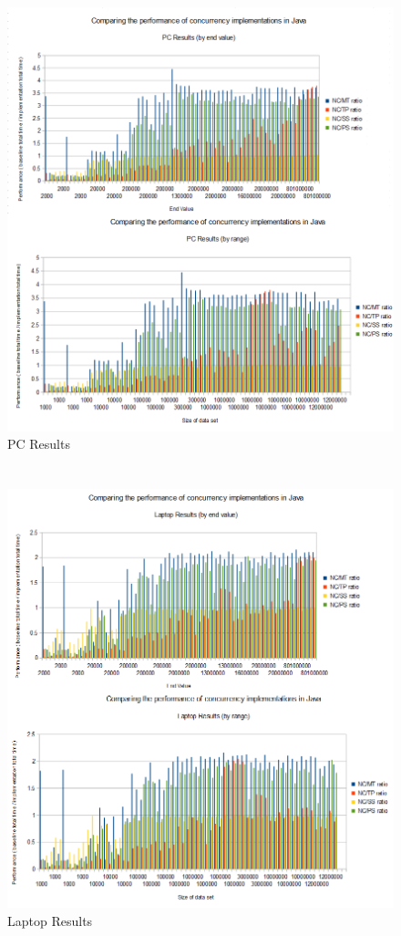\documentclass[]{report}
\begin{document}
\chapter{}
\begin{figure}[h!]
	\caption{PC Results}
	\includegraphics[scale=0.75]{PC_GRAPHS.png}
\end{figure}

\chapter{}
\begin{figure}[h!]
	\caption{Laptop Results}
	\includegraphics[scale=0.75]{LAPTOP_GRAPHS.png}
\end{figure}
\end{document}
